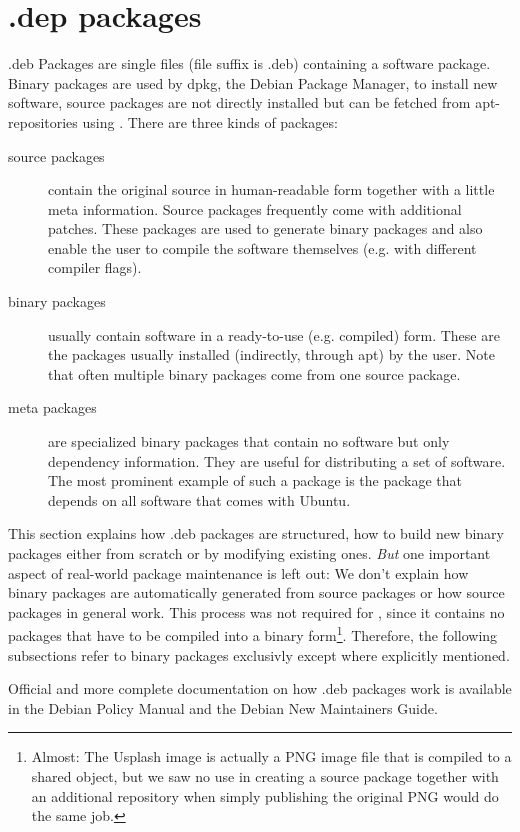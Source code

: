 \section{.dep packages}\label{chapter:deb packages}
.deb Packages are single files (file suffix is .deb) containing a software
package. Binary packages are used by dpkg, the Debian Package Manager, to
install new software, source packages are not directly installed but can be
fetched from apt-repositories using . 
There are three kinds of packages:
\begin{description}
  \item[source packages] contain the original source in human-readable form
    together with a little meta information. Source packages frequently come
    with additional patches. These packages are used to generate binary
    packages and also enable the user to compile the software themselves (e.g.
    with different compiler flags).
  \item[binary packages] usually contain software in a ready-to-use (e.g.
    compiled) form. These are the packages usually installed (indirectly,
    through apt) by the user. Note that often multiple binary packages come from
    one source package.
  \item[meta packages] are specialized binary packages that contain no software
    but only dependency information. They are useful for distributing a set of
    software. The most prominent example of such a package is the package
     that depends on all software that comes with Ubuntu.
\end{description}

This section explains how .deb packages are structured, how to build new
binary packages either from scratch or by modifying existing ones. \emph{But}
one important aspect of real-world package maintenance is left out: We don't
explain how binary packages are automatically generated from source packages or
how source packages in general work. This process was not required for \tunix,
since it contains no packages that have to be compiled into a binary
form\footnote{Almost: The \tunix{} Usplash image is actually a PNG image file that
is compiled to a shared object, but we saw no use in creating a source package
together with an additional repository when simply publishing the original PNG
would do the same job.}. Therefore, the following subsections refer to binary
packages exclusivly except where explicitly mentioned.

Official and more complete documentation on how .deb packages work is available 
in the Debian Policy Manual\cite{debian policy manual} and the Debian New
Maintainers Guide\cite{debian new maintainers guide}.

